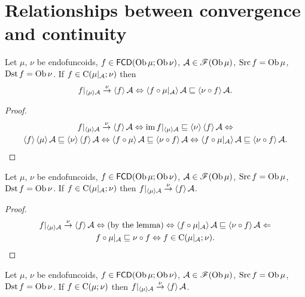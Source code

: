 \section{Relationships between convergence and continuity}
\begin{lem}
Let $\mu$, $\nu$ be endofuncoids, $f\in\mathsf{FCD}(\operatorname{Ob}\mu;\operatorname{Ob}\nu)$,
$\mathcal{A}\in\mathscr{F}(\operatorname{Ob}\mu)$, $\operatorname{Src} f=\operatorname{Ob}\mu$, $\operatorname{Dst} f=\operatorname{Ob}\nu$.
If $f\in\mathrm{C}(\mu|_{\mathcal{A}};\nu)$ then
\[
f|_{\left\langle \mu\right\rangle\mathcal{A}}\overset{\nu}{\rightarrow}\left\langle f\right\rangle\mathcal{A}\Leftrightarrow\left\langle f\circ\mu|_{\mathcal{A}}\right\rangle\mathcal{A}\sqsubseteq\left\langle \nu\circ f\right\rangle\mathcal{A}.
\]
\end{lem}
\begin{proof}
~
\begin{multline*}
f|_{\left\langle \mu\right\rangle\mathcal{A}}\overset{\nu}{\rightarrow}\left\langle f\right\rangle\mathcal{A}\Leftrightarrow\operatorname{im} f|_{\left\langle \mu\right\rangle\mathcal{A}}\sqsubseteq\left\langle \nu\right\rangle\left\langle f\right\rangle\mathcal{A}\Leftrightarrow\\
\left\langle f\right\rangle\left\langle \mu\right\rangle\mathcal{A}\sqsubseteq\left\langle \nu\right\rangle\left\langle f\right\rangle\mathcal{A}\Leftrightarrow\left\langle f\circ\mu\right\rangle\mathcal{A}\sqsubseteq\left\langle \nu\circ f\right\rangle\mathcal{A}\Leftrightarrow\left\langle f\circ\mu|_{\mathcal{A}}\right\rangle\mathcal{A}\sqsubseteq\left\langle \nu\circ f\right\rangle\mathcal{A}.
\end{multline*}
\end{proof}
\begin{thm}
Let $\mu$, $\nu$ be endofuncoids, $f\in\mathsf{FCD}(\operatorname{Ob}\mu;\operatorname{Ob}\nu)$,
$\mathcal{A}\in\mathscr{F}(\operatorname{Ob}\mu)$, $\operatorname{Src} f=\operatorname{Ob}\mu$, $\operatorname{Dst} f=\operatorname{Ob}\nu$.
If $f\in\mathrm{C}(\mu|_{\mathcal{A}};\nu)$ then $f|_{\left\langle \mu\right\rangle\mathcal{A}}\overset{\nu}{\rightarrow}\left\langle f\right\rangle\mathcal{A}$.\end{thm}
\begin{proof}
~
\begin{multline*}
f|_{\left\langle \mu\right\rangle\mathcal{A}}\overset{\nu}{\rightarrow}\left\langle f\right\rangle\mathcal{A}\Leftrightarrow\text{(by the lemma)}\Leftrightarrow\left\langle f\circ\mu|_{\mathcal{A}}\right\rangle\mathcal{A}\sqsubseteq\left\langle \nu\circ f\right\rangle\mathcal{A}\Leftarrow\\
f\circ\mu|_{\mathcal{A}}\sqsubseteq\nu\circ f\Leftrightarrow f\in\mathrm{C}(\mu|_{\mathcal{A}};\nu).
\end{multline*}
\end{proof}
\begin{cor}
Let $\mu$, $\nu$ be endofuncoids, $f\in\mathsf{FCD}(\operatorname{Ob}\mu;\operatorname{Ob}\nu)$,
$\mathcal{A}\in\mathscr{F}(\operatorname{Ob}\mu)$, $\operatorname{Src} f=\operatorname{Ob}\mu$, $\operatorname{Dst} f=\operatorname{Ob}\nu$.
If $f\in\mathrm{C}(\mu;\nu)$ then $f|_{\left\langle \mu\right\rangle\mathcal{A}}\overset{\nu}{\rightarrow}\left\langle f\right\rangle\mathcal{A}$.\end{cor}
